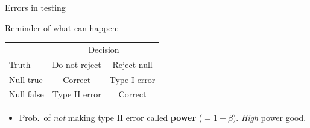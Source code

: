 \documentclass[unknownkeysallowed]{beamer}\usepackage[]{graphicx}\usepackage[]{color}
\begin{document}
\begin{frame}{Errors in testing}

Reminder of what can happen:

\bigskip

\begin{center}
\begin{tabular}{|l|cc|}
\hline
  & \multicolumn{2}{c|}{Decision}\\
Truth & Do not reject & Reject null\\
\hline
Null true & Correct & Type I error\\
Null false & Type II error & Correct\\
\hline
\end{tabular}  
\end{center}

\bigskip


\begin{itemize}
\item Prob.\ of \emph{not} making type II error called \textbf{power}
  ($=1-\beta)$. \emph{High} power good.
\end{itemize}
  
\end{frame}

  
\end{document}
